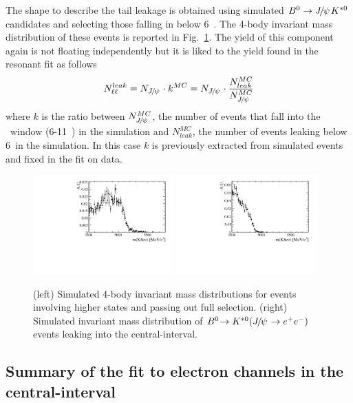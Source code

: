 The shape to describe the \jpsi tail leakage is obtained using simulated $\Bz\to\jpsi\Kstarz$ candidates
and selecting those falling in \qsq below 6~\gevgevcccc. The 4-body invariant mass distribution
of these events is reported in Fig.~\ref{fig:RKst_rare_misreco_distrib}. The yield of this component
again is not floating independently but it is liked to the yield found in the resonant fit as follows
\begin{equation}
N_{\ell\ell}^{leak} = N_{\jpsi} \cdot k^{MC} = N_{\jpsi} \cdot \frac{N_{leak}^{MC}}{N_{\jpsi}^{MC}}
\end{equation}
where $k$ is the ratio between $N_{\jpsi}^{MC}$, the number of \jpsi events
that fall into the \jpsi ~\qsq window (6-11~\gevgevcccc) in the simulation
and $N_{leak}^{MC}$, the number of \jpsi events leaking below 6~\gevgevcccc in the simulation.
In this case $k$ is previously extracted from simulated events and fixed in the fit on data.

\begin{figure}[h!]
\centering
\includegraphics[width=0.48\textwidth]{RKst/figs/misreco/part_had.pdf}
\includegraphics[width=0.48\textwidth]{RKst/figs/misreco/jpsi_leakage.pdf}
\caption{(left) Simulated 4-body invariant mass distributions for events involving
higher \Kstar states and passing out full selection. (right) Simulated invariant mass
distribution of $\decay{\Bz}{\Kstarz(\jpsi\to\ee)}$ events leaking into the central-\qsq interval.}
\label{fig:RKst_rare_misreco_distrib}
\end{figure}


\subsection{Summary of the fit to electron channels in the central-\qsq interval}

